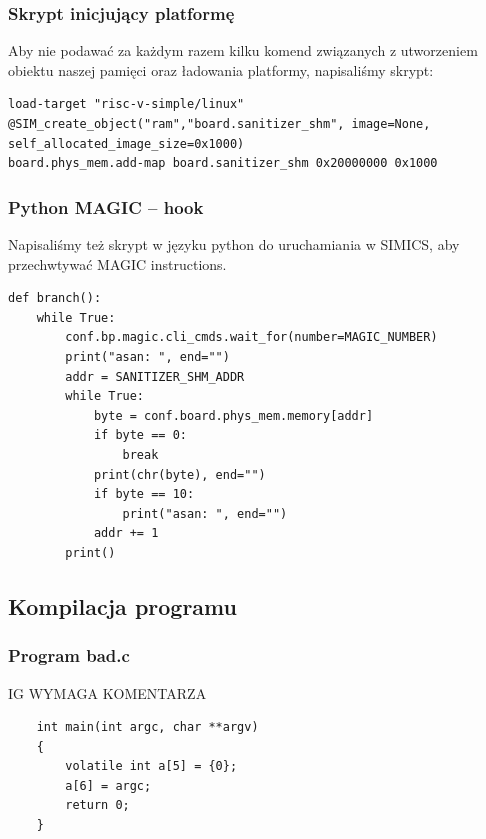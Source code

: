 \documentclass[../main.tex]{subfiles}
\begin{document}
\subsubsection{Skrypt inicjujący platformę}
Aby nie podawać za każdym razem kilku komend związanych z utworzeniem obiektu naszej pamięci oraz ładowania platformy, napisaliśmy skrypt:
	\begin{listing}
	\begin{verbatim}
load-target "risc-v-simple/linux"
@SIM_create_object("ram","board.sanitizer_shm", image=None, self_allocated_image_size=0x1000)
board.phys_mem.add-map board.sanitizer_shm 0x20000000 0x1000
	\end{verbatim}
\end{listing}

\subsubsection{Python MAGIC -- hook}
Napisaliśmy też skrypt w języku python do uruchamiania w SIMICS, aby przechwtywać MAGIC instructions.
	\begin{listing}
	\begin{verbatim}
def branch():
	while True:
		conf.bp.magic.cli_cmds.wait_for(number=MAGIC_NUMBER)
		print("asan: ", end="")
		addr = SANITIZER_SHM_ADDR
		while True:
			byte = conf.board.phys_mem.memory[addr]
			if byte == 0:
				break
			print(chr(byte), end="")
			if byte == 10:
				print("asan: ", end="")
			addr += 1
		print()
	\end{verbatim}
\end{listing}

\subsection{Kompilacja programu}



\subsubsection{Program bad.c}
IG WYMAGA KOMENTARZA
\begin{listing}
	\begin{verbatim}
	int main(int argc, char **argv)
	{
		volatile int a[5] = {0};
		a[6] = argc;
		return 0;
	}
	
	\end{verbatim}
\end{listing}
\end{document}
